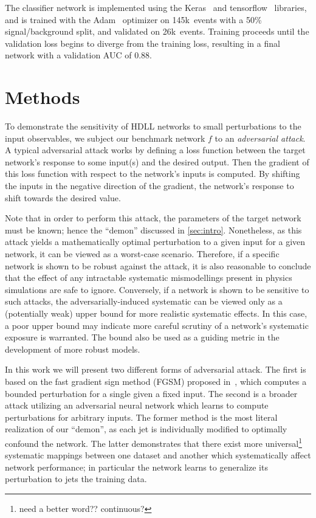 \documentclass[reprint,nofootinbib,...]{revtex4-1}
\newcommand{\ntrain}{145k}       %
\newcommand{\nval}{26k}            %
\newcommand{\aucCLS}{0.88}    %
\begin{document}
The classifier network is implemented using the Keras~\cite{keras} and tensorflow~\cite{tensorflow} libraries, and is trained with the Adam~\cite{adam} optimizer on \ntrain\ events with a 50\% signal/background split, and validated on \nval\ events.
Training proceeds until the validation loss begins to diverge from the training loss, resulting in a final network with a validation AUC of \aucCLS.


\section{Methods}
To demonstrate the sensitivity of HDLL networks to small perturbations to the input observables, we subject our benchmark network $f$ to an \textit{adversarial attack}.
A typical adversarial attack works by defining a loss function between the target network's response to some input(s) and the desired output.
Then the gradient of this loss function with respect to the network's inputs is computed.
By shifting the inputs in the negative direction of the gradient, the network's response to shift towards the desired value.

Note that in order to perform this attack, the parameters of the target network must be known; hence the ``demon'' discussed in \ref{sec:intro}.
Nonetheless, as this attack yields a mathematically optimal perturbation to a given input for a given network, it can be viewed as a worst-case scenario.
Therefore, if a specific network is shown to be robust against the attack, it is also reasonable to conclude that the effect of any intractable systematic mismodellings present in physics simulations are safe to ignore.
Conversely, if a network is shown to be sensitive to such attacks, the adversarially-induced systematic can be viewed only as a (potentially weak) upper bound for more realistic systematic effects.
In this case, a poor upper bound may indicate more careful scrutiny of a network's systematic exposure is warranted.
The bound also be used as a guiding metric in the development of more robust models.

In this work we will present two different forms of adversarial attack.
The first is based on the fast gradient sign method (FGSM) proposed in~\cite{DBLP:journals/corr/GoodfellowSS14}, which computes a bounded perturbation for a single given a fixed input.
The second is a broader attack utilizing an adversarial neural network which learns to compute perturbations for arbitrary inputs.
The former method is the most literal realization of our ``demon'', as each jet is individually modified to optimally confound the network.
The latter demonstrates that there exist more universal\footnote{need a better word?? continuous?} systematic mappings between one dataset and another which systematically affect network performance; in particular the network learns to generalize its perturbation to jets the training data.
\end{document}
